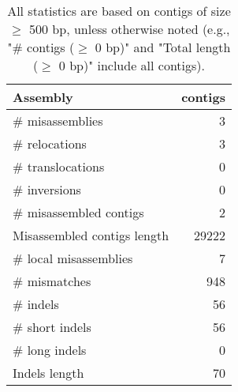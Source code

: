 \documentclass[12pt,a4paper]{article}
\begin{document}
\begin{table}[ht]
\begin{center}
\caption{All statistics are based on contigs of size $\geq$ 500 bp, unless otherwise noted (e.g., "\# contigs ($\geq$ 0 bp)" and "Total length ($\geq$ 0 bp)" include all contigs).}
\begin{tabular}{|l*{1}{|r}|}
\hline
Assembly & contigs \\ \hline
\# misassemblies & 3 \\ \hline
\hspace{5mm}\# relocations & 3 \\ \hline
\hspace{5mm}\# translocations & 0 \\ \hline
\hspace{5mm}\# inversions & 0 \\ \hline
\# misassembled contigs & 2 \\ \hline
Misassembled contigs length & 29222 \\ \hline
\# local misassemblies & 7 \\ \hline
\# mismatches & 948 \\ \hline
\# indels & 56 \\ \hline
\hspace{5mm}\# short indels & 56 \\ \hline
\hspace{5mm}\# long indels & 0 \\ \hline
Indels length & 70 \\ \hline
\end{tabular}
\end{center}
\end{table}
\end{document}
